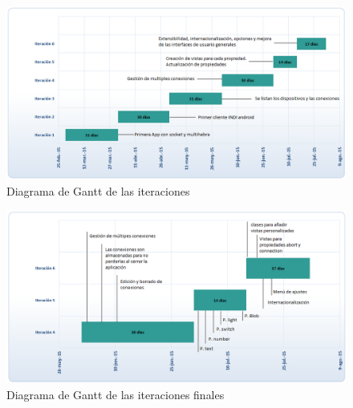\begin{figure}[!ht]
  \begin{center}
  \includegraphics[width=1\textwidth]{../images/iteraciones.png}
  \caption{Diagrama de Gantt de las iteraciones}
  \label{fig:iteraciones}
  \end{center}
\end{figure}


\begin{figure}[!ht]
  \begin{center}
  \includegraphics[width=1\textwidth]{../images/iteraciones_finales.png}
  \caption{Diagrama de Gantt de las iteraciones finales}
  \label{fig:iteraciones_finales}
  \end{center}
\end{figure}

